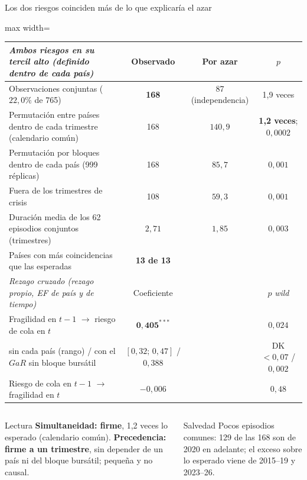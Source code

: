 \documentclass[aspectratio=169]{beamer}
\begin{document}
\begin{frame}{Los dos riesgos coinciden más de lo que explicaría el azar}
\centering
\footnotesize
\begin{adjustbox}{max width=\textwidth}
\begin{tabular}{l ccc}
\toprule
\textit{Ambos riesgos en su tercil alto (definido dentro de cada país)} & Observado & Por azar & $p$ \\
\midrule
Observaciones conjuntas ($22{,}0\%$ de 765) & \textbf{168} & 87 (independencia) & 1,9 veces \\
Permutación entre países dentro de cada trimestre (calendario común) & 168 & $140{,}9$ & \textbf{1,2 veces}; $0{,}0002$ \\
Permutación por bloques dentro de cada país (999 réplicas) & 168 & $85{,}7$ & $0{,}001$ \\
Fuera de los trimestres de crisis & 108 & $59{,}3$ & $0{,}001$ \\
Duración media de los 62 episodios conjuntos (trimestres) & $2{,}71$ & $1{,}85$ & $0{,}003$ \\
Países con más coincidencias que las esperadas & \textbf{13 de 13} & & \\
\midrule
\textit{Rezago cruzado (rezago propio, EF de país y de tiempo)} & Coeficiente & & $p$ \textit{wild} \\
\midrule
Fragilidad en $t-1$ $\to$ riesgo de cola en $t$ & $\mathbf{0{,}405^{***}}$ & & $0{,}024$ \\
\quad sin cada país (rango) / con el $GaR$ sin bloque bursátil & $[0{,}32;\,0{,}47]$ / $0{,}388$ & & DK $<0{,}07$ / $0{,}002$ \\
Riesgo de cola en $t-1$ $\to$ fragilidad en $t$ & $-0{,}006$ & & $0{,}48$ \\
\bottomrule
\end{tabular}
\end{adjustbox}
\vspace{-2pt}
\begin{columns}[T]
\begin{block}{Lectura}
\footnotesize \textbf{Simultaneidad: firme}, 1,2 veces lo esperado (calendario común). \textbf{Precedencia: firme a un trimestre}, sin depender de un país ni del bloque bursátil; pequeña y no causal.
\end{block}
\begin{alertblock}{Salvedad}
\footnotesize Pocos episodios comunes: 129 de las 168 son de 2020 en adelante; el exceso sobre lo esperado viene de 2015--19 y 2023--26.
\end{alertblock}
\end{columns}
\end{frame}
\end{document}
